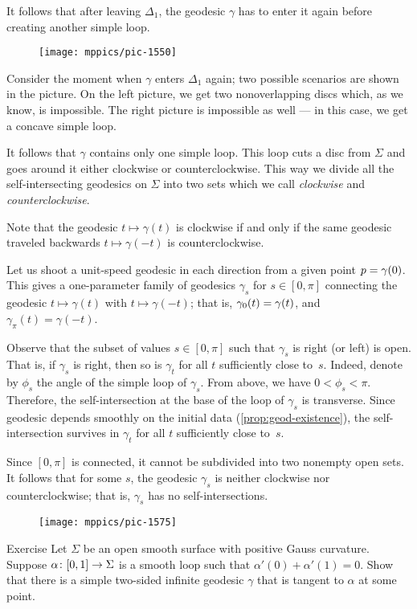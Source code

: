 It follows that after leaving $\Delta_1$, the geodesic $\gamma$ has to enter it again before creating another simple loop.
\begin{figure}[h!]
\vskip-0mm
\centering
\texttt{[image: mppics/pic-1550]}
\end{figure}
Consider the moment when $\gamma$ enters $\Delta_1$ again;
two possible scenarios are shown in the picture.
On the left picture, we get two nonoverlapping discs which, as we know, is impossible.
The right picture is impossible as well --- in this case, we get a concave simple loop.

It follows that $\gamma$ contains only one simple loop.
This loop cuts a disc from $\Sigma$ 
and goes around it either clockwise or counterclockwise.
This way we divide all the self-intersecting geodesics on $\Sigma$
into two sets which we call {}\emph{clockwise} and {}\emph{counterclockwise}.

Note that the geodesic $t\mapsto \gamma(t)$ is clockwise 
if and only if the same geodesic traveled backwards
$t\mapsto \gamma(-t)$
is counterclockwise.

Let us shoot a unit-speed geodesic in each direction from a given point $p\z=\gamma(0)$.
This gives a one-parameter family of geodesics $\gamma_s$ for $s\in[0,\pi]$ connecting the geodesic $t\mapsto \gamma(t)$ with $t\mapsto \gamma(-t)$; that is, $\gamma_0(t)\z=\gamma(t)$, and $\gamma_\pi(t)=\gamma(-t)$.

Observe that the subset of values $s\in [0,\pi]$ such that $\gamma_s$ is right (or left) is open.
That is, if $\gamma_s$ is right, then so is $\gamma_t$ for all $t$ sufficiently close to~$s$.
Indeed, denote by $\phi_s$ the angle of the simple loop of $\gamma_s$.
From above, we have $0<\phi_s<\pi$.
Therefore, the self-intersection at the base of the loop of $\gamma_s$ is transverse.
Since geodesic depends smoothly on the initial data 
(\ref{prop:geod-existence}), the self-intersection survives in $\gamma_t$ for all $t$ sufficiently close to~$s$.

Since $[0,\pi]$ is connected, it cannot be subdivided into two nonempty open sets.
It follows that for some $s$, the geodesic $\gamma_s$ is neither  clockwise nor counterclockwise;
that is, $\gamma_s$ has no self-intersections.
\qeds

{

\begin{wrapfigure}{r}{17 mm}
\vskip-4mm
\centering
\texttt{[image: mppics/pic-1575]}
\end{wrapfigure}

\begin{thm}{Exercise}\label{ex:cohn-vossen}
Let $\Sigma$ be an open smooth surface with positive Gauss curvature.
Suppose $\alpha\:[0,1]\z\to \Sigma$ is a smooth loop such that $\alpha'(0)+\alpha'(1)=0$.
Show that there is a simple two-sided infinite geodesic $\gamma$ that is tangent to $\alpha$ at some point.
\end{thm}

}

